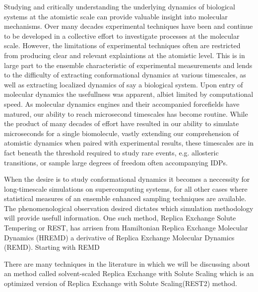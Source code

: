 Studying and critically understanding the underlying dynamics of biological systems at the atomistic scale can provide valuable insight into molecular mechanisms. 
Over many decades experimental techniques have been and continue to be developed in a collective effort to investigate processes at the molecular scale.
However, the limitations of experimental techniques often are restricted from producing clear and relevant explaintions at the atomistic level. 
This is in large part to the ensemble characteristic of experimental measurements and lends to the difficulty of extracting conformational dynamics at various timescales, as well as extracting localized dynamics of say a biological system. 
Upon entry of molecular dynamics the usefullness was apparent, albiet limited by computational speed. 
As molecular dynamics engines\cite{Weiner1981,gotz2012,salomon-ferrer2013,Brooks1983,Brooks2009,VanDerSpoel2005} and their accompanied forcefields\cite{Huang2016,Ploetz2021,Cornell1995,lindorff-larsen2010,Robustelli2018,Jakobsen2015,Piana2020} have matured, our ability to reach microsecond timescales has become routine. 
While the product of many decades of effort have resulted in our ability to simulate microseconds for a single biomolecule, vastly extending our comprehension of atomistic dynamics when paired with experimental results, these timescales are in fact beneath the threshold required to study rare events, e.g. allosteric transitions, or sample large degrees of freedom often accompanying IDPs. 

When the desire is to study conformational dynamics it becomes a neccessity for long-timescale simulations on supercomputing systems\cite{Shaw2009,Shaw2014}, for all other cases where statistical measures of an ensemble enhanced sampling techniques are available\cite{Lee2016,Wang2011,Qi2018,Vitalis2009,Zhang2023,Ray2023,Prakash2018}. 
The phenomenological observation desired dictates which simulation methodology will provide usefull information.
One such method, Replica Exchange Solute Tempering or REST\cite{Liu2005,Wang2011,Zhang2023}, has arrisen from Hamiltonian Replica Exchange Molecular Dynamics (HREMD) a derivative of Replica Exchange Molecular Dynamics (REMD). 
Starting with REMD 



There are many techniques in the literature in which we will be discussing about an method called solvent-scaled Replica Exchange with Solute Scaling which is an optimized version of Replica Exchange with Solute Scaling(REST2) method.   